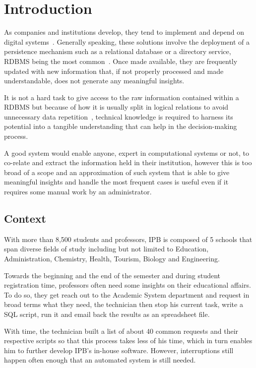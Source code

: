\chapter{Introduction}
As companies and institutions develop, they tend to implement and depend on digital systems~\cite{ibm}. Generally speaking, these solutions involve the deployment of a persistence mechanism such as a relational database or a directory service, \gls{RDBMS} being the most common~\cite{apachedp}. Once  made available, they are frequently updated with new information that, if not properly processed and made understandable, does not generate any meaningful insights.

It is not a hard task to give access to the raw information contained within a \gls{RDBMS} but because of how it is usually split in logical relations to avoid unnecessary data repetition~\cite[Part~$\mathrm{V}$]{vaquinha}, technical knowledge is required to harness its potential into a tangible understanding that can help in the decision-making process. 

A good system would enable anyone, expert in computational systems or not, to co-relate and extract the information held in their institution, however this is too broad of a scope and an approximation of such system that is able to give meaningful insights and handle the most frequent cases is useful even if it requires some manual work by an administrator.

\section{Context}\label{context}
With more than 8,500 students and professors, \gls{IPB} is composed of 5 schools that span diverse fields of study including but not limited to Education, Administration, Chemistry, Health, Tourism, Biology and Engineering.

Towards the beginning and the end of the semester and during student registration time, professors often need some insights on their educational affairs. To do so, they get reach out to the Academic System department and request in broad terms what they need, the technician then stop his current task, write a \gls{SQL} script, run it and email back the results as an spreadsheet file.

With time, the technician built a list of about 40 common requests and their respective scripts so that this process takes less of his time, which in turn enables him to further develop \gls{IPB}'s in-house software. However, interruptions still happen often enough that an automated system is still needed.

